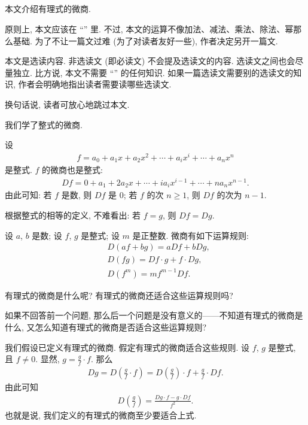 \subsection*{\DerivativesOfRationalExpressions}
\markright{\DerivativesOfRationalExpressions}

本文介绍有理式的微商.

原则上, 本文应该在 ``\OperationsOnRationalExprsssions'' 里. 不过, 本文的运算不像加法、减法、乘法、除法、幂那么基础. 为了不让一篇文过难 (为了对读者友好一些), 作者决定另开一篇文.

本文是选读内容. 非选读文 (即必读文) 不会提及选读文的内容. 选读文之间也会尽量独立. 比方说, 本文不需要 ``\CompositionOfRationalExpressions'' 的任何知识. 如果一篇选读文需要别的选读文的知识, 作者会明确地指出读者需要读哪些选读文.

换句话说, 读者可放心地跳过本文.

\myLine

我们学了整式的微商.

设
\begin{align*}
    f = a_0 + a_1 x + a_2 x^2 + \cdots + a_i x^i + \cdots + a_n x^n
\end{align*}
是整式. $f$ 的微商也是整式:
\begin{align*}
    Df = 0 + a_1 + 2a_2 x + \cdots + i a_i x^{i-1} + \cdots + n a_n x^{n-1}.
\end{align*}
由此可知: 若 $f$ 是数, 则 $Df$ 是 $0$; 若 $f$ 的次 $n \geq 1$, 则 $Df$ 的次为 $n - 1$.

根据整式的相等的定义, 不难看出: 若 $f = g$, 则 $Df = Dg$.

设 $a$, $b$ 是数; 设 $f$, $g$ 是整式; 设 $m$ 是正整数. 微商有如下运算规则:
\begin{align*}
     & D(af + bg) = aDf + bDg,          \\
     & D(fg) = Df \cdot g + f \cdot Dg, \\
     & D(f^m) = mf^{m-1} Df.
\end{align*}

有理式的微商是什么呢? 有理式的微商还适合这些运算规则吗?

如果不回答前一个问题, 那么后一个问题是没有意义的——不知道有理式的微商是什么, 又怎么知道有理式的微商是否适合这些运算规则?

我们假设已定义有理式的微商. 假定有理式的微商适合这些规则. 设 $f$, $g$ 是整式, 且 $f \neq 0$. 显然, $g = \frac{g}{f} \cdot f$. 那么
\begin{align*}
    Dg = D \left( \frac{g}{f} \cdot f \right) = D\left( \frac{g}{f} \right) \cdot f + \frac{g}{f} \cdot Df.
\end{align*}
由此可知
\begin{align*}
    D \left( \frac{g}{f} \right) = \frac{Dg \cdot f - g \cdot Df}{f^2}.
\end{align*}
也就是说, 我们定义的有理式的微商至少要适合上式.


